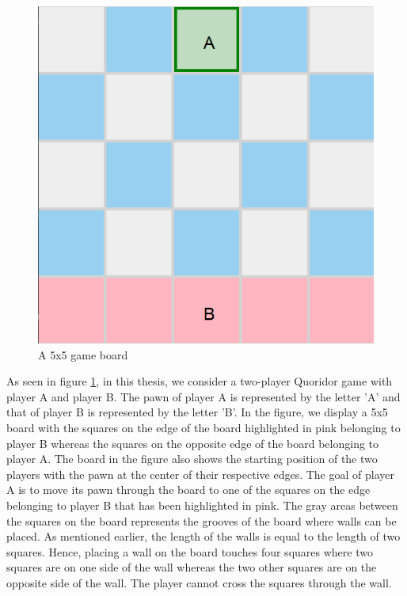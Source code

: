 \begin{figure}[!ht]
    \centering
    \includegraphics[scale=0.25]{../img/GameBoard/initial.png}
    \caption{A 5x5 game board}
    \label{fig:InitialGameBoard}
\end{figure}

As seen in figure \ref{fig:InitialGameBoard}, in this thesis, we consider a two-player Quoridor game with player A and player B. The pawn of player A is represented by the letter 'A' and that of player B is represented by the letter 'B'. In the figure, we display a 5x5 board with the squares on the edge of the board highlighted in pink belonging to player B whereas the squares on the opposite edge of the board belonging to player A. The board in the figure also shows the starting position of the two players with the pawn at the center of their respective edges. The goal of player A is to move its pawn through the board to one of the squares on the edge belonging to player B that has been highlighted in pink. The gray areas between the squares on the board represents the grooves of the board where walls can be placed. As mentioned earlier, the length of the walls is equal to the length of two squares. Hence, placing a wall on the board touches four squares where two squares are on one side of the wall whereas the two other squares are on the opposite side of the wall. The player cannot cross the squares through the wall. 


